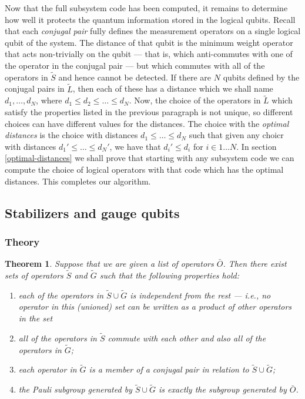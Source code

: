 \documentclass[twocolumn,showpacs,preprintnumbers,amsmath,amssymb,nofootinbib,pra,floatfix]{revtex4}
\newtheorem{theorem}{Theorem}
\begin{document}
Now that the full subsystem code has been computed, it remains to determine how well it protects the quantum information stored in the logical qubits.  Recall that each \emph{conjugal pair} fully defines the measurement operators on a single logical qubit of the system.  The distance of that qubit is the minimum weight operator that acts non-trivially on the qubit --- that is, which anti-commutes with one of the operator in the conjugal pair --- but which commutes with all of the operators in $\tilde S$ and hence cannot be detected.  If there are $N$ qubits defined by the conjugal pairs in $\tilde L$, then each of these has a distance which we shall name $d_1,\dots,d_N$, where $d_1\le d_2 \le \dots \le d_N$.  Now, the choice of the operators in $\tilde L$ which satisfy the properties listed in the previous paragraph is not unique, so different choices can have different values for the distances.  The choice with the \emph{optimal distances} is the choice with distances $d_1\le \dots \le d_N$ such that given any choicr with distances $d_1'\le \dots \le d_N'$, we have that $d_i' \le d_i$ for $i\in 1\dots N$.  In section \ref{optimal-distances} we shall prove that starting with any subsystem code we can compute the choice of logical operators with that code which has the optimal distances.  This completes our algorithm.
\subsection{Stabilizers and gauge qubits}

\label{stabilizers-and-gauge-qubits}

\subsubsection{Theory}

\begin{theorem} \label{theorem-SG} Suppose that we are given a list of operators $\bar O$.  Then there exist sets of operators $\tilde S$ and $\tilde G$ such that the following properties hold:
\begin{enumerate}
\item each of the operators in $\tilde S \cup \tilde G$ is
  independent from the rest --- i.e., no operator in this (unioned) set can
  be written as a product of other operators in the set
\item \label{theorem-all-commute-SG-prop} all of the operators in $\tilde S$ commute with each other and
  also all of the operators in $\tilde G$;
\item \label{theorem-conjugal-pairs-SG-prop} each operator in $\tilde G$ is a member of a conjugal pair in relation to $\tilde S \cup \tilde G$;
\item \label{theorem-complete-SG-prop} the Pauli subgroup generated by $\tilde S \cup \tilde G$ is exactly
  the subgroup generated by $\bar O$.
\end{enumerate}
\end{theorem}
\end{document}
